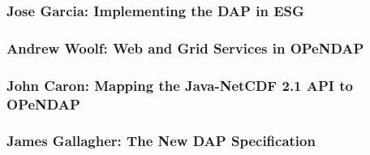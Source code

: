 \subsubsection{Jose Garcia: Implementing the \ac{DAP} in \ac{ESG}}


\subsubsection{Andrew Woolf: Web and Grid Services in \ac{OPeNDAP}}


\subsubsection{John Caron: Mapping the Java-\ac{NetCDF} 2.1 
\ac{API} to \ac{OPeNDAP}}


\subsubsection{James Gallagher: The New \ac{DAP} Specification}



%
%
%
%

